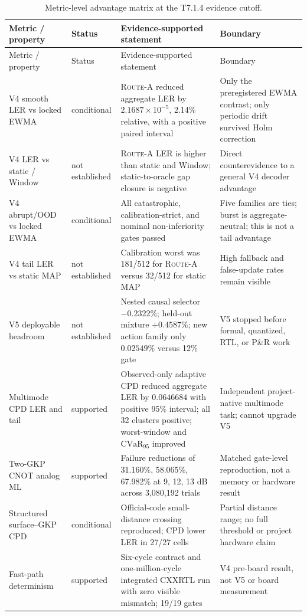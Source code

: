 \documentclass[11pt]{article}
\newcommand{\RouteA}{\textsc{Route-A}}
\newcommand{\supported}{\textcolor{green!40!black}{supported}}
\newcommand{\conditional}{\textcolor{orange!75!black}{conditional}}
\newcommand{\blocked}{\textcolor{red!65!black}{not established}}
\begin{document}
{\small
\begin{longtable}{@{}L{0.19\textwidth} L{0.18\textwidth} L{0.35\textwidth} L{0.18\textwidth}@{}}
\caption{Metric-level advantage matrix at the T7.1.4 evidence cutoff.}
\label{tab:advantage-matrix}\\
\toprule
Metric / property & Status & Evidence-supported statement & Boundary \\
\midrule
\endfirsthead
\toprule
Metric / property & Status & Evidence-supported statement & Boundary \\
\midrule
\endhead
V4 smooth LER vs locked EWMA & \conditional & \RouteA{} reduced aggregate LER by $2.1687\times10^{-5}$, 2.14\% relative, with a positive paired interval & Only the preregistered EWMA contrast; only periodic drift survived Holm correction \\
V4 LER vs static / Window & \blocked & \RouteA{} LER is higher than static and Window; static-to-oracle gap closure is negative & Direct counterevidence to a general V4 decoder advantage \\
V4 abrupt/OOD vs locked EWMA & \conditional & All catastrophic, calibration-strict, and nominal non-inferiority gates passed & Five families are ties; burst is aggregate-neutral; this is not a tail advantage \\
V4 tail LER vs static MAP & \blocked & Calibration worst was 181/512 for \RouteA{} versus 32/512 for static MAP & High fallback and false-update rates remain visible \\
V5 deployable headroom & \blocked & Nested causal selector $-0.2322\%$; held-out mixture $+0.4587\%$; new action family only $0.02549\%$ versus 12\% gate & V5 stopped before formal, quantized, RTL, or P\&R work \\
Multimode CPD LER and tail & \supported & Observed-only adaptive CPD reduced aggregate LER by $0.0646684$ with positive 95\% interval; all 32 clusters positive; worst-window and $\mathrm{CVaR}_{95}$ improved & Independent project-native multimode task; cannot upgrade V5 \\
Two-GKP CNOT analog ML & \supported & Failure reductions of 31.160\%, 58.065\%, 67.982\% at 9, 12, 13 dB across 3,080,192 trials & Matched gate-level reproduction, not a memory or hardware result \\
Structured surface--GKP CPD & \conditional & Official-code small-distance crossing reproduced; CPD lower LER in 27/27 cells & Partial distance range; no full threshold or project hardware claim \\
Fast-path determinism & \supported & Six-cycle contract and one-million-cycle integrated CXXRTL run with zero visible mismatch; 19/19 gates & V4 pre-board result, not V5 or board measurement \\

\end{longtable}}
\end{document}
